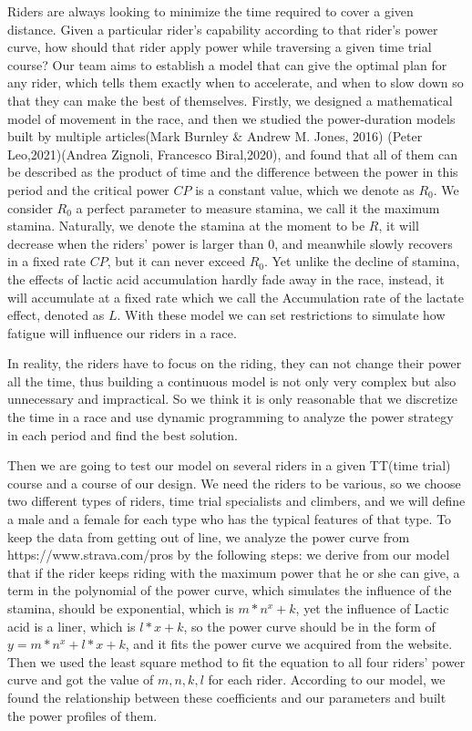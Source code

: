 \documentclass[12pt]{article}
\begin{document}
Riders are always looking to minimize the time required to cover a given distance. Given a
particular rider's capability according to that rider's power curve, how should that rider apply
power while traversing a given time trial course?
Our team aims to establish a model that can give the optimal plan for any  rider, which tells them exactly when to accelerate,
and when to slow down so that they can make the best of themselves. Firstly, we designed a mathematical model of movement in the race, and then we studied the power-duration models built by multiple articles(Mark Burnley \& Andrew M. Jones, 2016)\cite{doi:10.1080/17461391.2016.1249524}
(Peter Leo,2021)\cite{leo2021power}(Andrea Zignoli, Francesco Biral,2020)\cite{zignoli2020prediction}, and found that all of them can be described as the product of time and the difference
between the power in this period and the critical power $CP$ is a constant value, which we denote as $R_0$. We consider $R_0$ a perfect parameter to measure stamina, we call
it the maximum stamina. Naturally, we denote the stamina at the moment to be $R$, it
will decrease when the riders' power is larger than 0, and meanwhile slowly recovers in a fixed rate $CP$,
but it can never exceed $R_0$. Yet unlike the decline of stamina, the effects of lactic acid accumulation hardly fade away in the race, instead,
it will accumulate at a fixed rate which we call the Accumulation rate of the lactate effect, denoted as $L$. With these model we can set restrictions
to simulate how fatigue will influence our riders in a race.

In reality, the riders have to focus on the riding, they can not change their power all the time, thus building a continuous model is not only very complex but also unnecessary and impractical.
So we think it is only reasonable that we discretize the time in a race and use dynamic programming to analyze the power strategy in each period and find the best solution.

Then we are going to test our model on several riders in a given TT(time trial) course and a course of our design. We need the riders to be various, so we choose two different types of riders, time trial
specialists and climbers, and we will define a male and a female for each type who has the typical features of that type.
To keep the data from getting out of line, we analyze the power curve
from https://www.strava.com/pros by the following steps:
we derive from our model that if the rider keeps riding with the maximum power that he or she can give, a term in the polynomial of the power curve,  which simulates the influence of the stamina, should be exponential,
which is $m*n^x+k$, yet the influence of Lactic acid is a liner, which is $l*x+k$, so the power curve should be in the form of $y=m*n^x+l*x+k$,
and it fits the power curve we acquired from the website.
Then we used the least square method to fit the equation to all four riders' power curve and  %
got the value of $m,n,k,l$ for each rider. According to our model, we found the relationship between these
coefficients and our parameters and built the power profiles of them.
\end{document}
